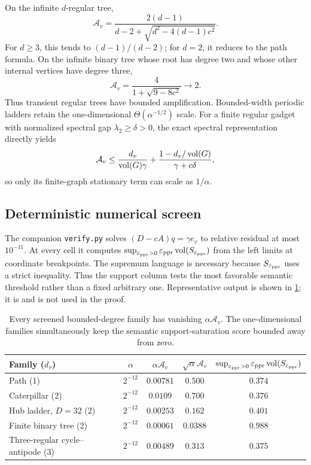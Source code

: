 \documentclass[11pt]{article}
\begin{document}
On the infinite $d$-regular tree,
\begin{equation}
 \mathcal A_v
 =\frac{2(d-1)}
 {d-2+\sqrt{d^2-4(d-1)c^2}}.
 \label{eq:bounded-return-regular-tree}
\end{equation}
For $d\ge3$, this tends to $(d-1)/(d-2)$; for $d=2$, it reduces to the path
formula.  On the infinite binary tree whose root has degree two and whose
other internal vertices have degree three,
\begin{equation}
 \mathcal A_v=\frac{4}{1+\sqrt{9-8c^2}}\longrightarrow2.
 \label{eq:bounded-return-binary-tree}
\end{equation}
Thus transient regular trees have bounded amplification.  Bounded-width
periodic ladders retain the one-dimensional $\Theta(\alpha^{-1/2})$ scale.
For a finite regular gadget with normalized spectral gap
$\lambda_2\ge\delta>0$, the exact spectral representation directly yields
\begin{equation}
 \mathcal A_v
 \le\frac{d_v}{\operatorname{vol}(G)\gamma}
 +\frac{1-d_v/\operatorname{vol}(G)}{\gamma+c\delta},
 \label{eq:bounded-return-expander}
\end{equation}
so only its finite-graph stationary term can scale as $1/\alpha$.

\subsection{Deterministic numerical screen}

The companion \texttt{verify.py} solves $(D-cA)q=\gamma e_v$ to relative
residual at most $10^{-11}$.  At every cell it computes
$\sup_{\varepsilon_{\mathrm{ppr}}>0}\varepsilon_{\mathrm{ppr}}\operatorname{vol}(S_{\varepsilon_{\mathrm{ppr}}})$ from the left limits at coordinate
breakpoints.  The supremum language is necessary because
$S_{\varepsilon_{\mathrm{ppr}}}$ uses a strict inequality.  Thus the support column tests the
most favorable semantic threshold rather than a fixed arbitrary one.
Representative output is shown in \cref{tab:bounded-return-screen}; it is
\statusempirical{} and is not used in the proof.

\begin{table}[t]
\centering
\small
\begin{tabular}{lcccc}
\toprule
Family ($d_v$) & $\alpha$ & $\alpha\mathcal A_v$
& $\sqrt\alpha\mathcal A_v$
& $\sup_{\varepsilon_{\mathrm{ppr}}>0}\varepsilon_{\mathrm{ppr}}\operatorname{vol}(S_{\varepsilon_{\mathrm{ppr}}})$ \\
\midrule
Path (1) & $2^{-12}$ & $0.00781$ & $0.500$ & $0.374$ \\
Caterpillar (2) & $2^{-12}$ & $0.0109$ & $0.700$ & $0.376$ \\
Hub ladder, $D=32$ (2) & $2^{-12}$ & $0.00253$ & $0.162$ & $0.401$ \\
Finite binary tree (2) & $2^{-12}$ & $0.00061$ & $0.0388$ & $0.988$ \\
Three-regular cycle--antipode (3) & $2^{-12}$ & $0.00489$ & $0.313$ & $0.375$ \\
\bottomrule
\end{tabular}
\caption{Every screened bounded-degree family has vanishing
$\alpha\mathcal A_v$.  The one-dimensional families simultaneously keep the
semantic support-saturation score bounded away from zero.}
\label{tab:bounded-return-screen}
\end{table}
\end{document}
